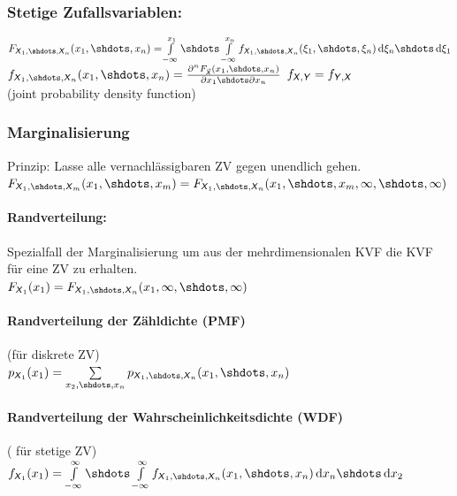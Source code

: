 \documentclass[6pt,a4paper]{scrartcl}
\begin{document}
\begin{multicols*}{4}
{\subsubsection*{Stetige Zufallsvariablen:}
$F_{\X_1,\shdots,\X_n}(x_1,\shdots,x_n) =\! \int\limits_{-\infty}^{x_1}\shdots\int\limits_{-\infty}^{x_n}{f_{\X_1,\shdots,\X_n}(\xi_1,\shdots,\xi_n)\diff\xi_n\shdots\diff\xi_1}$\\
$f_{\X_1,\shdots,\X_n}(x_1,\shdots,x_n) = \frac{\partial^n F_{\vec{\X}}(x_1,\shdots,x_n)}{\partial x_1\shdots\partial x_n}$ \hfill $f_{\operatorname{\textsf{\textit{X}}},\operatorname{\textsf{\textit{Y}}}} = f_{\operatorname{\textsf{\textit{Y}}},\operatorname{\textsf{\textit{X}}}}$\\
(joint probability density function)

\subsubsection{Marginalisierung}
Prinzip: Lasse alle vernachlässigbaren ZV gegen unendlich gehen. \\
$F_{\X_1,\shdots,\X_m}(x_1,\shdots,x_m) =
F_{\X_1,\shdots,\X_n}(x_1,\shdots,x_m,\infty,\shdots,\infty)$
\paragraph{Randverteilung:}
Spezialfall der Marginalisierung um aus der mehrdimensionalen KVF die KVF für eine ZV zu erhalten. \\
$F_{\X_1}(x_1) = 
F_{\X_1,\shdots,\X_n}(x_1,\infty,\shdots,\infty)$

\paragraph{Randverteilung der Zähldichte (PMF)}
(für diskrete ZV) \\
$p_{\X_1}(x_1) = \sum\limits_{x_2,\shdots,x_n}{p_{\X_1,\shdots,\X_n}(x_1,\shdots,x_n)}$

\paragraph{Randverteilung der Wahrscheinlichkeitsdichte (WDF)} ( für stetige ZV) \\
$f_{\X_1}(x_1) = \int\limits_{-\infty}^{\infty}{\shdots\int\limits_{-\infty}^{\infty}{f_{\X_1,\shdots,\X_n}(x_1,\shdots,x_n)\diff x_n\shdots}\diff x_2}$
}


\end{multicols*}
\end{document}

